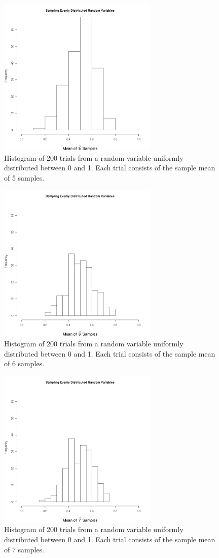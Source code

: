\documentclass[12pt]{article}
\begin{document}
\begin{figure}[htp]
  \centerline{\includegraphics[height=3in]{centralLimit5}}
  \caption{Histogram of 200 trials from a random variable uniformly
    distributed between 0 and 1. Each trial consists of the sample
    mean of 5 samples.}
  \label{fig:centralLimitFive}
\end{figure}

\begin{figure}[htp]
  \centerline{\includegraphics[height=3in]{centralLimit6}}
  \caption{Histogram of 200 trials from a random variable uniformly
    distributed between 0 and 1. Each trial consists of the sample
    mean of 6 samples.}
  \label{fig:centralLimitSix}
\end{figure}

\begin{figure}[htp]
  \centerline{\includegraphics[height=3in]{centralLimit7}}
  \caption{Histogram of 200 trials from a random variable uniformly
    distributed between 0 and 1. Each trial consists of the sample
    mean of 7 samples.}
  \label{fig:centralLimitSeven}
\end{figure}
\end{document}

